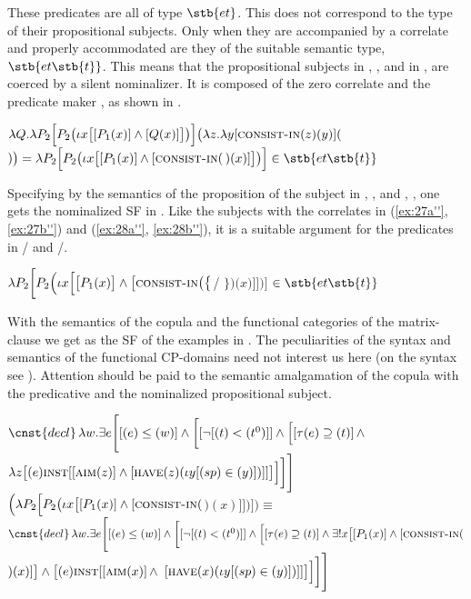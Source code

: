 \documentclass[output=paper,
colorlinks,
citecolor=brown,
newtxmath
]{langscibook}
\begin{document}
\noindent These predicates are all of type $\stb{et}$. This does not correspond to the type of their propositional subjects. Only when they are accompanied by a correlate and properly accommodated are they of the suitable semantic type, $\stb{et\stb{t}}$. This means that the propositional subjects in , , and in ,  are coerced by a silent nominalizer. It is composed of the zero correlate  and the predicate maker , as shown in .

\ea\label{ex:29}
$\lambda Q . \lambda P_2 \Big[P_2 \big(\iota x \big[[P_1 (x)] \wedge [Q (x) ]\big]\big)\Big] \big(\lambda z . \lambda y [\textsc{consist-in} (z) (y)] ($$)\big) = \lambda P_2 \Big[P_2 \big(\iota x \big[[P_1 (x)] \wedge [\textsc{consist-in} ($$) (x)]\big]\big)\Big] \in \stb{et\stb{t}}$
\z

\noindent Specifying  by the semantics of the proposition of the subject in , , and , , one gets the nominalized SF in . Like the subjects with the correlates in (\ref{ex:27a''}, \ref{ex:27b''}) and (\ref{ex:28a''}, \ref{ex:28b''}), it is a suitable argument for the predicates in / and /.

\ea\label{ex:30}
$\lambda P_2 \bigg[P_2 \Big(\iota x \Big[\big[P_1 (x)\big] \wedge \big[\textsc{consist-in}\big( \big\{$/ $\big\}\big) \big(x\big)\big]\Big]\Big)\bigg]$ $\in \stb{et\stb{t}}$
\z

\noindent With the semantics of the copula and the functional categories of the matrix-clause we get  as the SF of the examples in . The peculiarities of the syntax and semantics of the functional CP-domains need not interest us here (on the syntax see ). Attention should be paid to the semantic amalgamation of the copula with the predicative and the nominalized propositional subject.

    \begin{doublespace} %

\ea\label{ex:31}
$\cnst{decl} \, \lambda w . \exists e \Bigg[[(e) \leq (w)] \wedge \bigg[[\lnot[(t) < (t^{0})]] \wedge \Big[[\tau(e) \supseteq (t)] \, \wedge$ $\lambda z \big[(e) \textsc{inst} [[\textsc{aim} (z)] \wedge [\textsc{have} (z) (\iota y [(sp) \in (y)])]]\big]\Big]\bigg]\Bigg]$ $\Big(\lambda P_2 \Big[P_2 \big(\iota x \big[[P_1 (x)] \wedge [\textsc{consist-in} ($$) (x)]\big]\big)\Big]\Big) \equiv$ \\

$\cnst{decl} \, \lambda w . \exists e \Bigg[[(e) \leq (w)] \wedge \bigg[[\lnot[(t) < (t^{0})]] \wedge \Big[[\tau(e) \supseteq (t)] \wedge \exists!x \big[[P_1 (x)] \wedge [\textsc{consist-in} ($$) (x)]\big] \wedge \big[(e) \textsc{inst} [[\textsc{aim} (x)] \, \wedge$ $[\textsc{have} (x) (\iota y [(sp) \in (y)])]]\big]\Big]\bigg]\Bigg]$
\z

    \end{doublespace}
\end{document}
